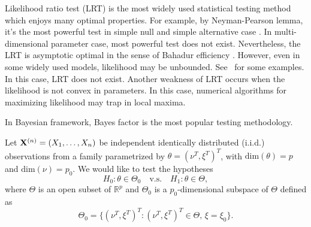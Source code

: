 \documentclass[3p]{elsarticle}
\theoremstyle{plain}
\theoremstyle{definition}
\theoremstyle{remark}
\begin{document}









Likelihood ratio test (LRT) is the most widely used statistical testing method which enjoys many optimal properties.
For example, by Neyman-Pearson lemma, it's the most powerful test in simple null and simple alternative case \citep{Lehmann}.
In multi-dimensional parameter case, most powerful test does not exist.
Nevertheless, the LRT is asymptotic optimal in the sense of Bahadur efficiency \citep{MR0315820}.
However, even in some widely used models, likelihood may be unbounded. See~\cite{Cam1990Maximum} for some examples.
In this case, LRT does not exist. Another weakness of LRT occurs when the likelihood is not convex in parameters. In this case, numerical algorithms for maximizing likelihood may trap in local maxima. 

In Bayesian framework, Bayes factor is the most popular testing methodology.



Let $\mathbf{X}^{(n)}=(X_1,\ldots,X_n)$ be independent identically distributed (i.i.d.) observations from a family parametrized by $\theta=(\nu^T,\xi^T)^T$, with $\text{dim}(\theta)=p$ and $\text{dim}(\nu)=p_0$.
We would like to test the hypotheses
\begin{equation*}
    H_0:\theta\in\Theta_0\quad \text{v.s.}\quad H_1:\theta\in\Theta,
\end{equation*}
where $\Theta$ is an open subset of $\mathbb{R}^p$ and  $\Theta_0$ is a $p_0$-dimensional subspace of $\Theta$ defined as
\begin{equation*}
    \Theta_0=\{(\nu^T,\xi^T)^T:(\nu^T,\xi^T)^T\in\Theta, \, \xi=\xi_0\}.
\end{equation*}
\end{document}
